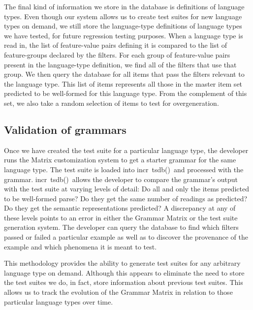 \documentclass[11pt]{article}
\newcommand{\itsdb}{\mbox{\sf \lbrack incr tsdb()\rbrack}}
\begin{document}
The final kind of information we store in the database is definitions
of language types.  Even though our system allows us to create test
suites for new language types on demand, we still store the
language-type definitions of language types we have tested, for future
regression testing purposes.  When a language type is read in, the
list of feature-value pairs defining it is compared to the list of
feature-groups declared by the filters.  For each group of
feature-value pairs present in the language-type definition, we find
all of the filters that use that group.  We then query the database
for all items that pass the filters relevant to the language type.
This list of items represents all those in the master item set
predicted to be well-formed for this language type.  From the
complement of this set, we also take a random selection of items to
test for overgeneration.

\subsection{Validation of grammars}


Once we have created the test suite for a particular language type,
the developer runs the Matrix customization system to get a starter
grammar for the same language type.  The test suite is loaded into
\itsdb\ and processed with the grammar.  \itsdb\ allows the developer
to compare the grammar's output with the test suite at varying levels
of detail: Do all and only the items predicted to be well-formed
parse?  Do they get the same number of readings as predicted?  Do they
get the semantic representations predicted?  A discrepancy at any of
these levels points to an error in either the Grammar Matrix or the
test suite generation system.  The developer can query the database to
find which filters passed or failed a particular example as well as to
discover the provenance of the example and which phenomena it is meant
to test.


This methodology provides the ability to generate test suites for any
arbitrary language type on demand.  Although this appears to eliminate
the need to store the test suites we do, in fact, store information
about previous test suites. This allows us to track the evolution of
the Grammar Matrix in relation to those particular language types over
time.
\end{document}
